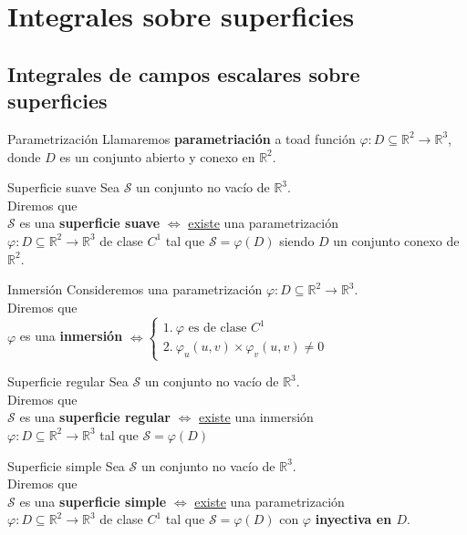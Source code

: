 \documentclass{report}
\newcommand\reals{\mathds{R}}
\begin{document}
\chapter{Integrales sobre superficies}
\section{Integrales de campos escalares sobre superficies}
\begin{defbox}{Parametrización}
	Llamaremos \textbf{parametriación} a toad función $\varphi : D \subseteq \reals^2 \rightarrow \reals^3$, donde $D$ es un conjunto abierto y conexo en $\reals^2$.
\end{defbox}

\begin{defbox}{Superficie suave}
	Sea $\mathcal{S}$ un conjunto no vacío de $\reals^3$. \\
	Diremos que \\
	$\mathcal{S}$ es una \textbf{superficie suave} $\iff$ \underline{existe} una parametrización \\ $\varphi : D \subseteq \reals^2 \rightarrow \reals^3$ de clase $C^1$ tal que $\mathcal{S}=\varphi (D)$ siendo $D$ un conjunto conexo de $\reals^2$.
\end{defbox}

\begin{defbox}{Inmersión}
	Consideremos una parametrización $\varphi : D \subseteq \reals^2 \rightarrow \reals^3$. \\
	Diremos que\\
	$\varphi$ es una \textbf{inmersión}
	$\iff \left\{\begin{array}{l}
			1. ~\varphi \text{ es de clase } C^1 \\
			2. ~\varphi_u(u,v)\times \varphi_v(u,v) \ne 0
		\end{array}\right.$
\end{defbox}

\begin{defbox}{Superficie regular}
	Sea $\mathcal{S}$ un conjunto no vacío de $\reals^3$. \\
	Diremos que \\
	$\mathcal{S}$ es una \textbf{superficie regular} $\iff$ \underline{existe} una inmersión \\ $\varphi : D \subseteq \reals^2 \rightarrow \reals^3$ tal que $\mathcal{S} = \varphi (D)$
\end{defbox}

\begin{defbox}{Superficie simple}
	Sea $\mathcal{S}$ un conjunto no vacío de $\reals^3$. \\
	Diremos que \\
	$\mathcal{S}$ es una \textbf{superficie simple} $\iff$ \underline{existe} una parametrización \\ $\varphi : D \subseteq \reals^2 \rightarrow \reals^3$ de clase $C^1$ tal que $\mathcal{S}=\varphi (D)$ con $\varphi$ \textbf{inyectiva en $D$}.
\end{defbox}
\end{document}
